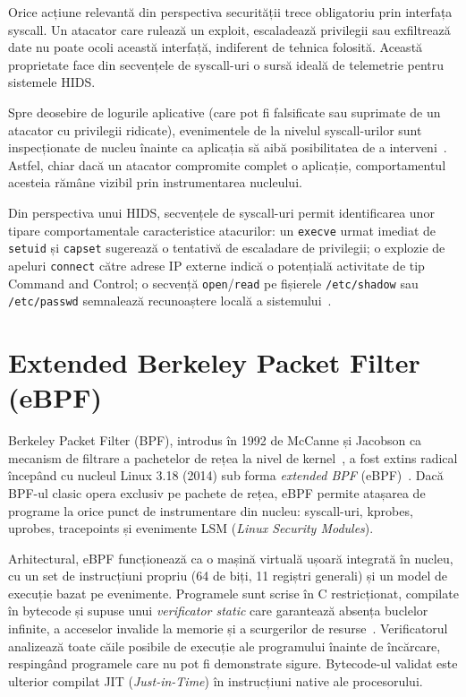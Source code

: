 Orice acțiune relevantă din perspectiva securității trece obligatoriu prin interfața syscall.
Un atacator care rulează un exploit, escaladează privilegii sau exfiltrează date nu poate ocoli
această interfață, indiferent de tehnica folosită. Această proprietate face din secvențele de
syscall-uri o sursă ideală de telemetrie pentru sistemele HIDS.

Spre deosebire de logurile aplicative (care pot fi falsificate sau suprimate de un atacator cu
privilegii ridicate), evenimentele de la nivelul syscall-urilor sunt inspecționate de nucleu
înainte ca aplicația să aibă posibilitatea de a interveni~\cite{tracee2024}. Astfel, chiar dacă
un atacator compromite complet o aplicație, comportamentul acesteia rămâne vizibil prin
instrumentarea nucleului.

Din perspectiva unui HIDS, secvențele de syscall-uri permit identificarea unor tipare
comportamentale caracteristice atacurilor: un \texttt{execve} urmat imediat de \texttt{setuid}
și \texttt{capset} sugerează o tentativă de escaladare de privilegii; o explozie de apeluri
\texttt{connect} către adrese IP externe indică o potențială activitate de tip Command and Control;
o secvență \texttt{open}/\texttt{read} pe fișierele \texttt{/etc/shadow} sau \texttt{/etc/passwd}
semnalează recunoaștere locală a sistemului~\cite{liu2018hids}.

\section{Extended Berkeley Packet Filter (eBPF)}

Berkeley Packet Filter (BPF), introdus în 1992 de McCanne și Jacobson ca mecanism de filtrare
a pachetelor de rețea la nivel de kernel~\cite{mccanne1993bsd}, a fost extins radical începând
cu nucleul Linux 3.18 (2014) sub forma \textit{extended BPF} (eBPF)~\cite{gregg2019bpf}. Dacă
BPF-ul clasic opera exclusiv pe pachete de rețea, eBPF permite atașarea de programe la orice
punct de instrumentare din nucleu: syscall-uri, kprobes, uprobes, tracepoints și evenimente LSM
(\textit{Linux Security Modules}).

Arhitectural, eBPF funcționează ca o mașină virtuală ușoară integrată în nucleu, cu un set de
instrucțiuni propriu (64 de biți, 11 regiștri generali) și un model de execuție bazat pe evenimente.
Programele sunt scrise în C restricționat, compilate în bytecode și supuse unui \textit{verificator
static} care garantează absența buclelor infinite, a acceselor invalide la memorie și a scurgerilor
de resurse~\cite{gregg2019bpf}. Verificatorul analizează toate căile posibile de execuție
ale programului înainte de încărcare, respingând programele care nu pot fi demonstrate sigure.
Bytecode-ul validat este ulterior compilat JIT (\textit{Just-in-Time}) în instrucțiuni native ale
procesorului.

